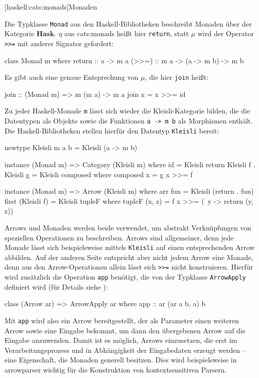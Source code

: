 \documentclass[12pt, a4paper, bibgerm]{scrbook}
\newenvironment{DIFnomarkup}{}{}
\newcommand\icode[1]{\lstinline?#1?}
\newcommand\lsubsection{}
\newcommand\sref{}
\begin{document}
\lsubsection[haskell:cats:monads]{Monaden}

Die Typklasse \icode{Monad} aus den Haskell-Bibliotheken beschreibt
Monaden über der Kategorie $\mathbf{Hask}$. $\eta$ aus
\sref{cats:monads} heißt hier \icode{return}, statt $\mu$ wird der
Operator \icode{>>=} %
mit anderer Signator gefordert:
\begin{DIFnomarkup}\begin{code}
class Monad m where
  return :: a -> m a
  (>>=)  :: m a -> (a -> m b) -> m b
\end{code}\end{DIFnomarkup} %
Es gibt auch eine genaue Entsprechung von $\mu$, die hier \icode{join}
heißt:
\begin{DIFnomarkup}\begin{code}
join :: (Monad m) => m (m a) -> m a
join x = x >>= id
\end{code}\end{DIFnomarkup} %

Zu jeder Haskell-Monade \icode{m} lässt sich wieder die
Kleisli-Kategorie bilden, die die Datentypen als Objekte sowie die
Funktionen \icode{a -> m b} als Morphismen enthält. Die
Haskell-Bibliotheken stellen hierfür den Datentyp \icode{Kleisli}
bereit:
\begin{DIFnomarkup}\begin{code}
newtype Kleisli m a b = Kleisli (a -> m b)

instance (Monad m) => Category (Kleisli m)
  where id = Kleisli return
        Kleisli f . Kleisli g = Kleisli composed
          where composed x = g x >>= f

instance (Monad m) => Arrow (Kleisli m)
  where arr fun = Kleisli (return . fun)
        first (Kleisli f) = Kleisli tupleF
          where tupleF (x, z) = f x >>= (\ y -> return (y, z))
\end{code}\end{DIFnomarkup} %

Arrows und Monaden werden beide verwendet, um abstrakt Verknüpfungen von
speziellen Operationen zu beschreiben. Arrows sind allgemeiner, denn
jede Monade lässt sich beispielsweise mittels \icode{Kleisli} auf einen
entsprechenden Arrow abbilden. Auf der anderen Seite entspricht aber
nicht jedem Arrow eine Monade, denn aus den Arrow-Operationen allein
lässt sich \icode{>>=} %
nicht konstruieren. Hierfür wird zusätzlich die Operation \icode{app}
benötigt, die von der Typklasse \icode{ArrowApply} definiert wird (für
Details siehe \cite[S. 18f]{Hughes}):
\begin{DIFnomarkup}\begin{code}
class (Arrow ar) => ArrowApply ar where
  app :: ar (ar a b, a) b
\end{code}\end{DIFnomarkup}
Mit \icode{app} wird also ein Arrow bereitgestellt, der als Parameter
einen weiteren Arrow sowie eine Eingabe bekommt, um dann den übergebenen
Arrow auf die Eingabe anzuwenden. Damit ist es möglich, Arrows
einzusetzen, die erst im Verarbeitungsprozess und in Abhängigkeit der
Eingabedaten erzeugt werden -- eine Eigenschaft, die Monaden generell
besitzen. Dies wird beispielsweise in \sref{arrowparser} wichtig für
die Konstruktion von kontextsensitiven Parsern.
\end{document}
